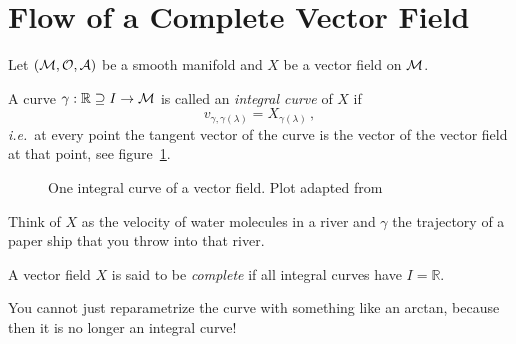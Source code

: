 \documentclass[11pt, a4paper, twocolumn]{article} %
\begin{document}
\section{Flow of a Complete Vector Field}
Let $(\mathcal{M}, \mathcal{O}, \mathcal{A})$ be a smooth manifold and $X$ be a vector field on $\mathcal{M}$. 
\begin{defn}
    A curve $\gamma: \mathbb{R} \supseteq I \to \mathcal{M}$ is called an \textit{integral curve}
    of $X$ if
    \begin{equation}
        v_{\gamma, \gamma(\lambda)} = X_{\gamma(\lambda)}\,,
    \end{equation}
    \textit{i.e.}\ at every point the tangent vector of the curve is the vector of the
    vector field at that point, see figure~\ref{fig:integralCurve}.
\end{defn}
\begin{figure}[tbh]
    \centering
    \caption{One integral curve of a vector field.
    Plot adapted from~\cite{texstackexchange:integralCurve}}
    \label{fig:integralCurve}
\end{figure}
\begin{note}
    Think of $X$ as the velocity of water molecules in a river and $\gamma$
    the trajectory of a paper ship that you throw into that river.
\end{note}
\begin{defn}
    A vector field $X$ is said to be \textit{complete} if all integral curves have
    $I=\mathbb{R}$.
\end{defn}
\begin{note}
    You cannot just reparametrize the curve with something like an arctan, because
    then it is no longer an integral curve!
\end{note}
\end{document}
